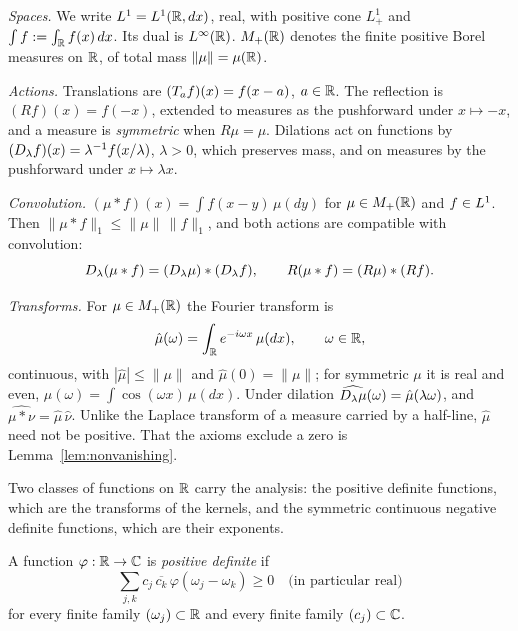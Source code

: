 \emph{Spaces.} We write $L^1 = L^1(\mathbb{R}, dx)$, real, with positive cone $L^1_+$ and
$\int f := \int_{\mathbb{R}} f(x)\,dx$. Its dual is $L^\infty(\mathbb{R})$. $M_+(\mathbb{R})$ denotes the finite
positive Borel measures on $\mathbb{R}$, of total mass $\|\mu\| = \mu(\mathbb{R})$.

\emph{Actions.} Translations are $(T_{a} f)(x) = f(x-a)$, $a \in \mathbb{R}$. The reflection is
$(Rf)(x) = f(-x)$, extended to measures as the pushforward under $x \mapsto -x$, and a
measure is \emph{symmetric} when $R\mu = \mu$. Dilations act on functions by
$(D_{\lambda} f)(x) = \lambda^{-1} f(x/\lambda)$, $\lambda > 0$, which preserves mass, and
on measures by the pushforward under $x \mapsto \lambda x$.

\emph{Convolution.} $(\mu * f)(x) = \int f(x-y)\,\mu(dy)$ for $\mu \in M_+(\mathbb{R})$ and
$f \in L^1$. Then $\|\mu * f\|_1 \le \|\mu\|\,\|f\|_1$, and both actions are compatible
with convolution:
\[
  D_{\lambda}(\mu * f) = (D_{\lambda}\mu) * (D_{\lambda}f), \qquad
  R(\mu * f) = (R\mu) * (Rf).
\]

\emph{Transforms.} For $\mu \in M_+(\mathbb{R})$ the Fourier transform is
\begin{equation}\label{eq:transform}
  \hat\mu(\omega) = \int_{\mathbb{R}} e^{-i\omega x}\,\mu(dx), \qquad \omega \in \mathbb{R},
\end{equation}
continuous, with $|\hat\mu| \le \|\mu\|$ and $\hat\mu(0) = \|\mu\|$; for symmetric $\mu$ it is
real and even, $\hat\mu(\omega) = \int \cos(\omega x)\,\mu(dx)$. Under dilation
$\widehat{D_{\lambda}\mu}(\omega) = \hat\mu(\lambda\omega)$, and
$\widehat{\mu * \nu} = \hat\mu\,\hat\nu$. Unlike the Laplace transform of a measure carried by
a half-line, $\hat\mu$ need not be positive. That the axioms exclude a zero is
Lemma~\ref{lem:nonvanishing}.

Two classes of functions on $\mathbb{R}$ carry the analysis: the positive definite functions, which
are the transforms of the kernels, and the symmetric continuous negative definite functions,
which are their exponents.

\begin{definition}\label{def:positive-definite}
A function $\varphi : \mathbb{R} \to \mathbb{C}$ is \emph{positive definite} if
\[
  \sum_{j,k} c_j\,\overline{c_k}\,\varphi(\omega_j - \omega_k) \ge 0
  \quad\text{(in particular real)}
\]
for every finite family $(\omega_j) \subset \mathbb{R}$ and every finite family $(c_j) \subset \mathbb{C}$.
\end{definition}


